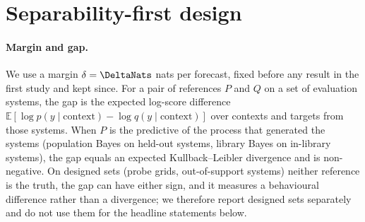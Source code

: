 \section{Separability-first design}\label{sec:design}
\paragraph{Margin and gap.} We use a margin $\delta=\DeltaNats$ nats per forecast, fixed before any result in the first
study and kept since. For a pair of references $P$ and $Q$ on a set of evaluation systems, the gap is the expected
log-score difference $\mathbb E[\log p(y\mid\text{context})-\log q(y\mid\text{context})]$ over contexts and targets from
those systems. When $P$ is the predictive of the process that generated the systems (population Bayes on held-out systems,
library Bayes on in-library systems), the gap equals an expected Kullback--Leibler divergence and is non-negative. On
designed sets (probe grids, out-of-support systems) neither reference is the truth, the gap can have either sign, and it
measures a behavioural difference rather than a divergence; we therefore report designed sets separately and do not use
them for the headline statements below.

